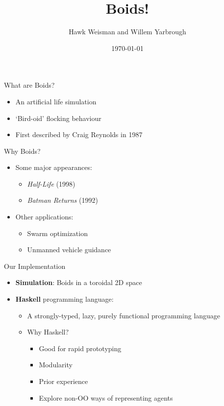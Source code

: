 \documentclass{beamer}
\title{\huge Boids!}
\author[Weisman and Yarbrough]{Hawk Weisman and Willem Yarbrough}
\institute[Allegheny College]{Department of Computer Science \\ Allegheny College}
\date{\today}
\begin{document}
\begin{frame}
  \titlepage
\end{frame}

\begin{frame}
    \huge{What are Boids?}\normalsize
    \begin{itemize}
        \item An artificial life simulation~\cite{hartman2006autonomous,reynolds1987flocks}
        \item `Bird-oid' flocking behaviour~\cite{hartman2006autonomous,reynolds1987flocks}
        \item First described by Craig Reynolds in 1987~\cite{reynolds1987flocks}
    \end{itemize}
\end{frame}

\begin{frame}
    \huge{Why Boids?}\normalsize
    \begin{itemize}
        \item Some major appearances:
        \begin{itemize}
            \item \textit{Half-Life} (1998)
            \item \textit{Batman Returns} (1992)
        \end{itemize}
        \item Other applications:
        \begin{itemize}
            \item Swarm optimization~\cite{cui2009boid}
            \item Unmanned vehicle guidance~\cite{saska2014swarms,min2011design}
        \end{itemize}
    \end{itemize}
\end{frame}

\begin{frame}
\huge{Our Implementation}\normalsize
\begin{itemize}
    \item \textbf{Simulation}: Boids in a toroidal 2D space
    \item \textbf{Haskell} programming language:
    \begin{itemize}
        \item A strongly-typed, lazy, purely functional programming language
        \item Why Haskell?
        \begin{itemize}
            \item Good for rapid prototyping~\cite{hudak1994haskell}
            \item Modularity~\cite{hughes1989functional}
            \item Prior experience
            \item Explore non-OO ways of representing agents
        \end{itemize}
    \end{itemize}
\end{itemize}

\end{frame}
\end{document}

